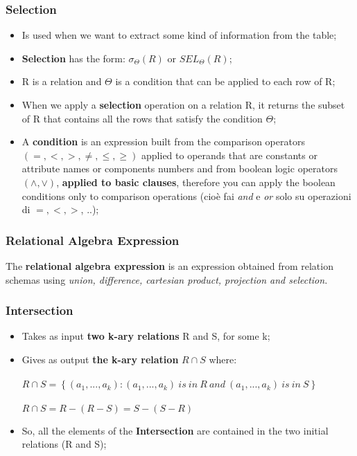 \documentclass{article}
\begin{document}
\subsubsection{Selection}
\begin{itemize}
\item Is used when we want to extract some kind of information from the table;
\item \textbf{Selection} has the form: $\sigma _{\Theta }(R)$ or $SEL_{\Theta}(R)$;
\item R is a relation and $\Theta$ is a condition that can be applied to each row of R;
\item When we apply a \textbf{selection} operation on a relation R, it returns the subset of R that contains all the rows that satisfy the condition $\Theta$;
\item A \textbf{condition} is an expression built from the comparison operators $(=, <, >,\neq ,\leq, \geq)$ applied to operands that are constants or attribute names or components numbers and from boolean logic operators $(\wedge, \vee)$, \textbf{applied to basic clauses}, therefore you can apply the boolean conditions only to comparison operations (cioè fai \emph{and} e \emph{or} solo su operazioni di $=, <, >$, ..);
\end{itemize}
\subsubsection{Relational Algebra Expression}
The \textbf{relational algebra expression} is an expression obtained from relation schemas using \emph{union, difference, cartesian product, projection and selection.}
\subsubsection{Intersection}
\begin{itemize}
\item Takes as input \textbf{two k-ary relations} R and S, for some k;
\item Gives as output \textbf{the k-ary relation} $R \cap S$ where:\\\\
$R \cap S = \left \{ (a_{1},...,a_{k}): (a_{1},...,a_{k})\: is\: in\: R\: and\:(a_{1},...,a_{k})\: is\: in\: S \right \}$
\\\\
$R \cap S = R - (R - S) = S - (S - R) $
\item So, all the elements of the \textbf{Intersection} are contained in the two initial relations (R and S);
\end{itemize}
\newpage
\end{document}
